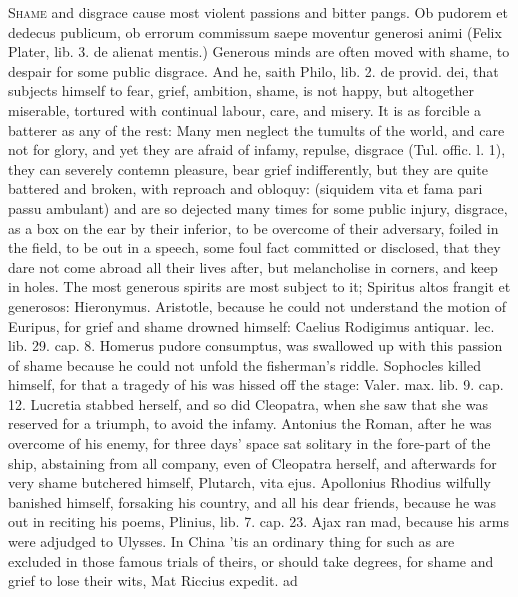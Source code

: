 {\lettrine{S}{hame} and disgrace cause most violent passions and bitter pangs. Ob
pudorem et dedecus publicum, ob errorum commissum saepe moventur
generosi animi (Felix Plater, lib. 3. de alienat mentis.) Generous
minds are often moved with shame, to despair for some public disgrace.
And he, saith Philo, lib. 2. de provid. dei, that subjects
himself to fear, grief, ambition, shame, is not happy, but altogether
miserable, tortured with continual labour, care, and misery. It is as
forcible a batterer as any of the rest: Many men neglect the
tumults of the world, and care not for glory, and yet they are afraid
of infamy, repulse, disgrace (Tul. offic. l. 1), they can severely
contemn pleasure, bear grief indifferently, but they are quite
battered and broken, with reproach and obloquy: (siquidem vita et
fama pari passu ambulant) and are so dejected many times for some
public injury, disgrace, as a box on the ear by their inferior, to be
overcome of their adversary, foiled in the field, to be out in a
speech, some foul fact committed or disclosed, \etc{} that they dare not
come abroad all their lives after, but melancholise in corners, and
keep in holes. The most generous spirits are most subject to it;
Spiritus altos frangit et generosos: Hieronymus. Aristotle, because he
could not understand the motion of Euripus, for grief and shame drowned
himself: Caelius Rodigimus antiquar. lec. lib. 29. cap. 8. Homerus
pudore consumptus, was swallowed up with this passion of shame 
because he could not unfold the fisherman's riddle. Sophocles killed
himself, for that a tragedy of his was hissed off the stage:
Valer. max. lib. 9. cap. 12. Lucretia stabbed herself, and so did
Cleopatra, when she saw that she was reserved for a triumph, to
avoid the infamy. Antonius the Roman, after he was overcome of
his enemy, for three days' space sat solitary in the fore-part of the
ship, abstaining from all company, even of Cleopatra herself, and
afterwards for very shame butchered himself, Plutarch, vita ejus.
Apollonius Rhodius wilfully banished himself, forsaking his
country, and all his dear friends, because he was out in reciting his
poems, Plinius, lib. 7. cap. 23. Ajax ran mad, because his arms were
adjudged to Ulysses. In China 'tis an ordinary thing for such as are
excluded in those famous trials of theirs, or should take degrees, for
shame and grief to lose their wits, Mat Riccius expedit. ad
}
